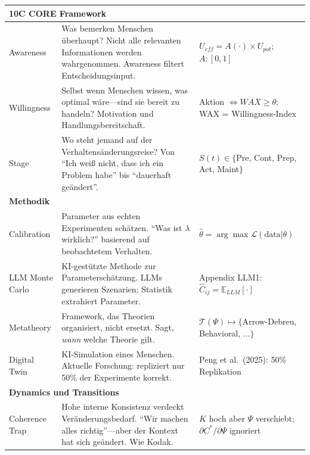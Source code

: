\begin{center}
\begin{longtable}{@{}p{2.5cm}p{5.2cm}p{5.2cm}@{}}
\midrule
\multicolumn{3}{l}{\cellcolor{red!10}\textbf{10C CORE Framework}} \\
\midrule

Awareness &
Was bemerken Menschen überhaupt? Nicht alle relevanten Informationen werden wahrgenommen. Awareness filtert Entscheidungsinput. &
$U_{eff} = A(\cdot) \times U_{pot}$; \newline $A: [0,1]$ \\

Willingness &
Selbst wenn Menschen wissen, was optimal wäre---sind sie bereit zu handeln? Motivation und Handlungsbereitschaft. &
Aktion $\Leftrightarrow WAX \geq \theta$; \newline WAX = Willingness-Index \\

Stage &
Wo steht jemand auf der Verhaltensänderungsreise? Von ``Ich weiß nicht, dass ich ein Problem habe'' bis ``dauerhaft geändert''. &
$S(t) \in \{$Pre, Cont, Prep, Act, Maint$\}$ \\

\midrule
\multicolumn{3}{l}{\cellcolor{purple!10}\textbf{Methodik}} \\
\midrule

Calibration &
Parameter aus echten Experimenten schätzen. ``Was ist $\lambda$ wirklich?'' basierend auf beobachtetem Verhalten. &
$\hat{\theta} = \arg\max \mathcal{L}(\text{data}|\theta)$ \\

LLM Monte Carlo &
KI-gestützte Methode zur Parameterschätzung. LLMs generieren Szenarien; Statistik extrahiert Parameter. &
Appendix LLM1: $\hat{C}_{ij} = \mathbb{E}_{LLM}[\cdot]$ \\

Metatheory &
Framework, das Theorien organisiert, nicht ersetzt. Sagt, \emph{wann} welche Theorie gilt. &
$\mathcal{T}(\Psi) \mapsto \{$Arrow-Debreu, Behavioral, ...$\}$ \\

Digital Twin &
KI-Simulation eines Menschen. Aktuelle Forschung: repliziert nur 50\% der Experimente korrekt. &
Peng et al.\ (2025): 50\% Replikation \\

\midrule
\multicolumn{3}{l}{\cellcolor{gray!10}\textbf{Dynamics und Transitions}} \\
\midrule

Coherence Trap &
Hohe interne Konsistenz verdeckt Veränderungsbedarf. ``Wir machen alles richtig''---aber der Kontext hat sich geändert. Wie Kodak. &
$K$ hoch aber $\Psi$ verschiebt; \newline $\partial C^*/\partial \Psi$ ignoriert \\


\end{longtable}
\end{center}
